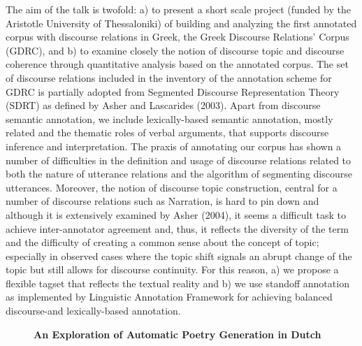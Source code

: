 \documentclass[10pt, a4paper, twopage, headinclude, footinclude, BCOR5mm]{scrartcl}
\begin{document}
{{\noindent
The aim of the talk is twofold: a) to present a short scale project (funded by the Aristotle University of Thessaloniki) of building and analyzing the first annotated corpus with discourse relations in Greek, the Greek Discourse Relations' Corpus (GDRC), and b) to examine closely the notion of discourse topic and discourse coherence through quantitative analysis based on the annotated corpus. The set of discourse relations included in the inventory of the annotation scheme for GDRC is partially adopted from Segmented Discourse Representation Theory (SDRT) as defined by Asher and Lascarides (2003). Apart from discourse semantic annotation, we include lexically-based semantic annotation, mostly related and the thematic roles of verbal arguments, that supports discourse inference and interpretation. The praxis of annotating our corpus has shown a number of difficulties in the definition and usage of discourse relations related to both the nature of utterance relations and the algorithm of segmenting discourse utterances. Moreover, the notion of discourse topic construction, central for a number of discourse relations such as Narration, is hard to pin down and although it is extensively examined by Asher (2004), it seems a difficult task to achieve inter-annotator agreement and, thus, it reflects the diversity of the term and the difficulty of creating a common sense about the concept of topic; especially in observed cases where the topic shift signals an abrupt change of the topic but still allows for discourse continuity. For this reason, a) we propose a flexible tagset that reflects the textual reality and b) we use standoff annotation as implemented by Linguistic Annotation Framework for achieving balanced discourse-and lexically-based annotation.  


\newpage

\begin{figure}[t!]
\centering
\large\textbf{An Exploration of Automatic Poetry Generation in Dutch}
\vspace*{0.5cm}
\end{figure}


        \begin{table}[t!]
\end{table}}}
\end{document}
